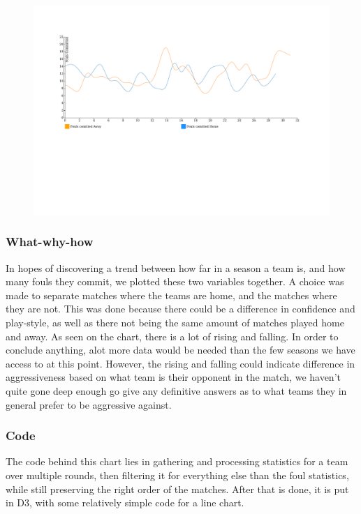 \documentclass[Report.tex]{subfiles}
\begin{document}
\begin{figure}
\center
\includegraphics[scale=0.6]{Figures/fouls.pdf}
\caption{}
\label{Fig:}
\end{figure}


\subsubsection{What-why-how}
In hopes of discovering a trend between how far in a season a team is, and how many fouls they commit, we plotted these two variables together. A choice was made to separate matches where the teams are home, and the matches where they are not. This was done because there could be a difference in confidence and play-style, as well as there not being the same amount of matches played home and away.
 As seen on the chart, there is a lot of rising and falling. In order to conclude anything, alot more data would be needed than the few seasons we have access to at this point. However, the rising and falling could indicate difference in aggressiveness based on what team is their opponent in the match, we haven't quite gone deep enough go give any definitive answers as to what teams they in general prefer to be aggressive against.

\subsubsection{Code}
The code behind this chart lies in gathering and processing statistics for a team over multiple rounds, then filtering it for everything else than the foul statistics, while still preserving the right order of the matches. After that is done, it is put in D3, with some relatively simple code for a line chart.
\end{document}
